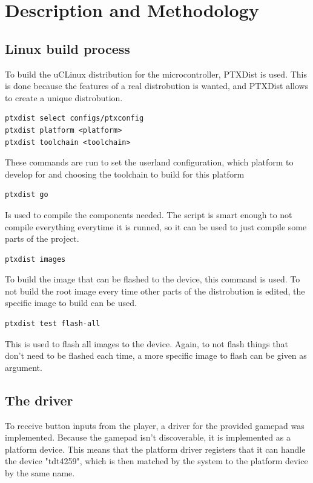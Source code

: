 \section{Description and Methodology}

\subsection{Linux build process}
To build the uCLinux distribution for the microcontroller, PTXDist is
used\cite{ptxdistguru}. This is done because the features of a real
distrobution is wanted, and PTXDist allows to create a unique distrobution.

\begin{verbatim}
ptxdist select configs/ptxconfig
ptxdist platform <platform>
ptxdist toolchain <toolchain>
\end{verbatim}

\noindent
These commands are run to set the userland configuration, which platform to
develop for and choosing the toolchain to build for this platform

\begin{verbatim}
ptxdist go
\end{verbatim}

\noindent
Is used to compile the components needed. The script is smart enough to not
compile everything everytime it is runned, so it can be used to just compile
some parts of the project.

\begin{verbatim}
ptxdist images
\end{verbatim}

\noindent
To build the image that can be flashed to the device, this command is used. To
not build the root image every time other parts of the distrobution is edited,
the specific image to build can be used.

\begin{verbatim}
ptxdist test flash-all
\end{verbatim}

\noindent
This is used to flash all images to the device. Again, to not flash things that
don't need to be flashed each time, a more specific image to flash can be given
as argument.


\subsection{The driver}

To receive button inputs from the player, a driver for the
provided gamepad was implemented. Because the gamepad isn't discoverable, it is
implemented as a platform device. This means that the platform driver
\footnotemark registers that it can handle the device "tdt4259", which is then
matched by the system to the platform device by the same name.


